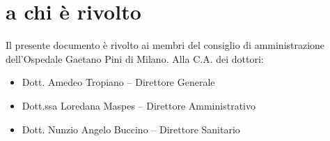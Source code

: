 %
%
\section[A chi è rivolto]{a chi è rivolto}
\label{abs-recipient}
Il presente documento è rivolto ai membri del consiglio di amministrazione dell'Ospedale Gaetano Pini di Milano. Alla C.A. dei dottori:

\begin{itemize}
\item{Dott. Amedeo Tropiano -- Direttore Generale}
\item{Dott.ssa Loredana Maspes -- Direttore Amministrativo}
\item{Dott. Nunzio Angelo Buccino -- Direttore Sanitario}
\end{itemize}